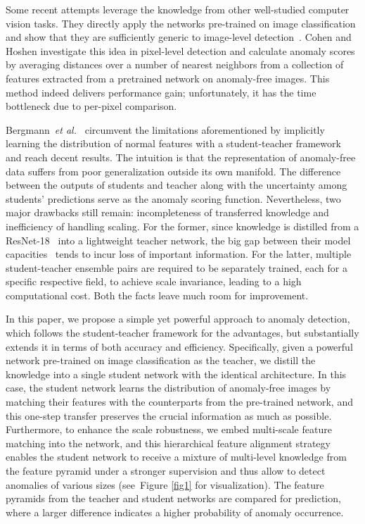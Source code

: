 \documentclass[final]{cvpr}
\begin{document}
Some recent attempts leverage the knowledge from other well-studied computer vision tasks. They directly apply the networks pre-trained on image classification and show that they are sufficiently generic to image-level detection~\cite{Andrews2016,Burlina2019,Erfani2016}. Cohen and Hoshen \cite{Cohen2020} investigate this idea in pixel-level detection and calculate anomaly scores by averaging distances over a number of nearest neighbors from a collection of features extracted from a pretrained network on anomaly-free images. This method indeed delivers performance gain; unfortunately, it has the time bottleneck due to per-pixel comparison.

Bergmann~\textit{et al.}~\cite{Bergmann2020} circumvent the limitations aforementioned by implicitly learning the distribution of normal features with a student-teacher framework and reach decent results. The intuition is that the representation of anomaly-free data suffers from poor generalization outside its own manifold. The difference between the outputs of students and teacher along with the uncertainty among students' predictions serve as the anomaly scoring function. Nevertheless, two major drawbacks still remain: \ie incompleteness of transferred knowledge and inefficiency of handling scaling.
For the former, since knowledge is distilled from a ResNet-18~\cite{He2016} into a lightweight teacher network, the big gap between their model capacities~\cite{Wang2020} tends to incur loss of important information. For the latter, multiple student-teacher ensemble pairs are required to be separately trained, each for a specific respective field, to achieve scale invariance, leading to a high computational cost. Both the facts leave much room for improvement.

In this paper, we propose a simple yet powerful approach to anomaly detection, which follows the student-teacher framework for the advantages, but substantially extends it in terms of both accuracy and efficiency. Specifically, given a powerful network pre-trained on image classification as the teacher, we distill the knowledge into a single student network with the identical architecture. In this case, the student network learns the distribution of anomaly-free images by matching their features with the counterparts from the pre-trained network, and this one-step transfer preserves the crucial information as much as possible. Furthermore, to enhance the scale robustness, we embed multi-scale feature matching into the network, and this hierarchical feature alignment strategy enables the student network to receive a mixture of multi-level knowledge from the feature pyramid under a stronger supervision and thus allow to detect anomalies of various sizes (see~Figure \ref{fig1} for visualization). The feature pyramids from the teacher and student networks are compared for prediction, where a larger difference indicates a higher probability of anomaly occurrence.
\end{document}
